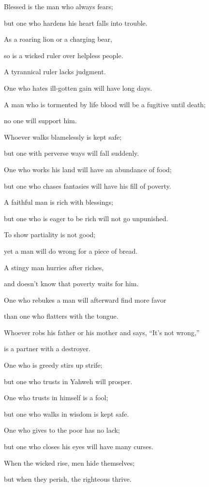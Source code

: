 {\par }{\Q {}Blessed is the man who always fears;
\par }{\QB but one who hardens his heart falls into trouble.
\par }{\Q {}As a roaring lion or a charging bear,
\par }{\QB so is a wicked ruler over helpless people.
\par }{\Q {}A tyrannical ruler lacks judgment.
\par }{\QB One who hates ill-gotten gain will have long days.
\par }{\Q {}A man who is tormented by life blood will be a fugitive until death;
\par }{\QB no one will support him.
\par }{\Q {}Whoever walks blamelessly is kept safe;
\par }{\QB but one with perverse ways will fall suddenly.
\par }{\Q {}One who works his land will have an abundance of food;
\par }{\QB but one who chases fantasies will have his fill of poverty.
\par }{\Q {}A faithful man is rich with blessings;
\par }{\QB but one who is eager to be rich will not go unpunished.
\par }{\Q {}To show partiality is not good;
\par }{\QB yet a man will do wrong for a piece of bread.
\par }{\Q {}A stingy man hurries after riches,
\par }{\QB and doesn’t know that poverty waits for him.
\par }{\Q {}One who rebukes a man will afterward find more favor
\par }{\QB than one who flatters with the tongue.
\par }{\Q {}Whoever robs his father or his mother and says, “It’s not wrong,”
\par }{\QB is a partner with a destroyer.
\par }{\Q {}One who is greedy stirs up strife;
\par }{\QB but one who trusts in Yahweh will prosper.
\par }{\Q {}One who trusts in himself is a fool;
\par }{\QB but one who walks in wisdom is kept safe.
\par }{\Q {}One who gives to the poor has no lack;
\par }{\QB but one who closes his eyes will have many curses.
\par }{\Q {}When the wicked rise, men hide themselves;
\par }{\QB but when they perish, the righteous thrive.

}
